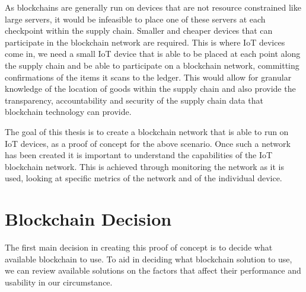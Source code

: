 As blockchains are generally run on devices that are not resource constrained like large servers, it would be infeasible to place one of these servers at each checkpoint within the supply chain. Smaller and cheaper devices that can participate in the blockchain network are required. This is where IoT devices come in, we need a small IoT device that is able to be placed at each point along the supply chain and be able to participate on a blockchain network, committing confirmations of the items it scans to the ledger. This would allow for granular knowledge of the location of goods within the supply chain and also provide the transparency, accountability and security of the supply chain data that blockchain technology can provide.

The goal of this thesis is to create a blockchain network that is able to run on IoT devices, as a proof of concept for the above scenario. Once such a network has been created it is important to understand the capabilities of the IoT blockchain network. This is achieved through monitoring the network as it is used, looking at specific metrics of the network and of the individual device.

\section{Blockchain Decision}
The first main decision in creating this proof of concept is to decide what available blockchain to use. To aid in deciding what blockchain solution to use, we can review available solutions on the factors that affect their performance and usability in our circumstance.  

